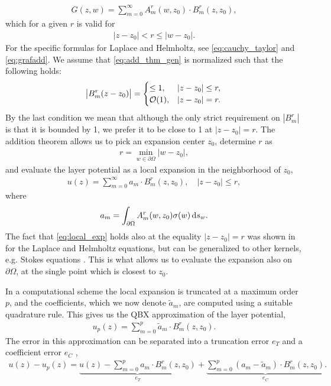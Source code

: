 \documentclass[hidelinks]{siamart1116}
\begin{document}
\begin{align}
  G(z, w) = \sum_{m=0}^\infty {A}_m^r(w, z_0) \cdot {B}_m^r(z, z_0) ,
  \label{eq:add_thm_gen}
\end{align}
which for a given $r$ is valid for
\begin{align}
  |z-z_0| < r \le |w-z_0|.
\end{align}
For the specific formulas for Laplace and Helmholtz, see
\eqref{eq:cauchy_taylor} and \eqref{eq:grafadd}.  We assume that
\eqref{eq:add_thm_gen} is normalized such that the following holds:
\begin{align}
  \abs{{B}_m^r(z-z_0)} =
  \begin{cases}
    \le 1, &|z-z_0| \le r,  \\
    {\mathcal{O}}(1), &|z-z_0| = r.
  \end{cases}
\label{eq:normalization}
\end{align}
By the last condition we mean that although the only strict
requirement on $|{B}_m^r|$ is that it is bounded by 1, we prefer it
to be close to 1 at $|z-z_0| = r$. The addition theorem allows us to
pick an expansion center $z_0$, determine $r$ as
\begin{align}
  r = \min_{w \in {{\partial\Omega}}} |w-z_0|,
\end{align}
and evaluate the layer potential as a local expansion in the
neighborhood of $z_0$,
\begin{align}
  u(z) = \sum_{m=0}^\infty {a}_m \cdot {B}_m^r(z, z_0), \quad |z-z_0| \le r,
  \label{eq:local_exp}
\end{align}
where
\begin{align}
  {a}_m = \int_{{\partial\Omega}} {A}_m^r(w, z_0) {\sigma}(w) \dif s_w .
  \label{eq:int_coeff}
\end{align}
The fact that \eqref{eq:local_exp} holds also at the equality
$|z-z_0|=r$ was shown in \cite{Epstein2013} for the Laplace and
Helmholtz equations, but can be generalized to other kernels,
e.g. Stokes equations \cite{AfKlinteberg2016qbx}. This is what allows
us to evaluate the expansion also on ${{\partial\Omega}}$, at the single point
which is closest to $z_0$.

In a computational scheme the local expansion is truncated at a
maximum order $p$, and the coefficients, which we now denote
$\tilde{a}_m$, are computed using a suitable quadrature
rule. This gives us the QBX approximation of the layer potential,
\begin{align}
  u_p(z) = \sum_{m=0}^p \tilde{a}_m \cdot {B}_m^r(z, z_0) .
  \label{eq:local_exp_p}
\end{align}
The error in this approximation can be separated into a truncation
error $e_T$ and a coefficient error $e_C$ \cite{Epstein2013},
\begin{align}
  u(z) - u_p(z) =
  \underbrace{u(z) - \sum_{m=0}^p {a}_m \cdot {B}_m^r(z, z_0)}_{e_T}
  + 
  \underbrace{\sum_{m=0}^p ({a}_m - \tilde{a}_m) \cdot {B}_m^r(z, z_0)}_{e_C} .
  \label{eq:err_split}
\end{align}
\end{document}
